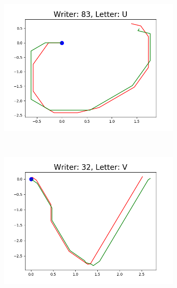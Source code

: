 \begin{figure}
\begin{subfigure}[b]{0.17\textwidth}
          \includegraphics[width=\textwidth]{images/framework/comparison_figures/U_83.png}
      \end{subfigure}
      ~
      \begin{subfigure}[b]{0.17\textwidth}
          \includegraphics[width=\textwidth]{images/framework/comparison_figures/V_32.png}
      \end{subfigure}
      ~
      \begin{subfigure}[b]{0.17\textwidth}

\end{subfigure}
\end{figure}
